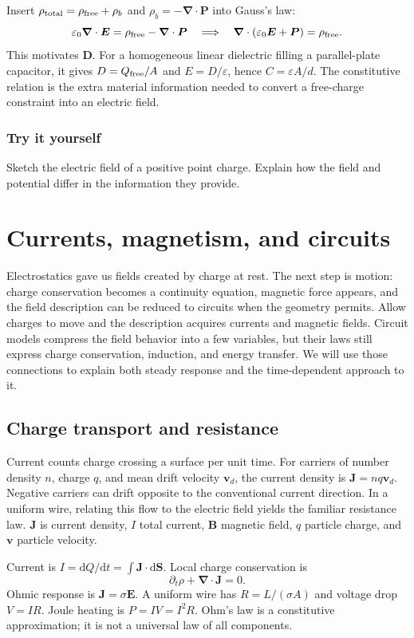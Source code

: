 \documentclass[11pt,oneside]{book}
\newcommand{\dd}{\mathrm{d}}
\newcommand{\vect}[1]{\boldsymbol{#1}}
\newcommand{\grad}{\boldsymbol{\nabla}}
\newcommand{\eps}{\varepsilon_0}
\theoremstyle{reviewstyle}
\newcommand{\learningcheck}[1]{\subsection*{Try it yourself}\noindent #1\par}
\begin{document}
Insert $\rho_{\rm total}=\rho_{\rm free}+\rho_b$ and $\rho_b=-\grad\cdot\vect P$ into Gauss's law:
\begin{equation}
\eps\grad\cdot\vect E=\rho_{\rm free}-\grad\cdot\vect P
\quad\Longrightarrow\quad
\grad\cdot(\eps\vect E+\vect P)=\rho_{\rm free}.
\end{equation}
This motivates $\vect D$. For a homogeneous linear dielectric filling a parallel-plate capacitor, it gives $D=Q_{\rm free}/A$ and $E=D/\varepsilon$, hence $C=\varepsilon A/d$. The constitutive relation is the extra material information needed to convert a free-charge constraint into an electric field.

\learningcheck{Sketch the electric field of a positive point charge. Explain how the field and potential differ in the information they provide.}

\chapter{Currents, magnetism, and circuits}
Electrostatics gave us fields created by charge at rest. The next step is motion: charge conservation becomes a continuity equation, magnetic force appears, and the field description can be reduced to circuits when the geometry permits.
Allow charges to move and the description acquires currents and magnetic fields. Circuit models compress the field behavior into a few variables, but their laws still express charge conservation, induction, and energy transfer. We will use those connections to explain both steady response and the time-dependent approach to it.

\section{Charge transport and resistance}
Current counts charge crossing a surface per unit time. For carriers of number density $n$, charge $q$, and mean drift velocity $\vect v_d$, the current density is $\vect J=nq\vect v_d$. Negative carriers can drift opposite to the conventional current direction. In a uniform wire, relating this flow to the electric field yields the familiar resistance law. $\vect J$ is current density, $I$ total current, $\vect B$ magnetic field, $q$ particle charge, and $\vect v$ particle velocity.

Current is $I=\dd Q/\dd t=\int\vect J\cdot\dd\vect S$. Local charge conservation is
\begin{equation}\partial_t\rho+\grad\cdot\vect J=0.\end{equation}
Ohmic response is $\vect J=\sigma\vect E$. A uniform wire has $R=L/(\sigma A)$ and voltage drop $V=IR$. Joule heating is $P=IV=I^2R$. Ohm's law is a constitutive approximation; it is not a universal law of all components.
\end{document}
